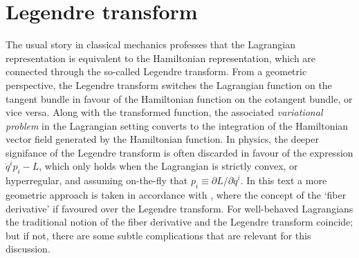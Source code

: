 \section{Legendre transform}
\label{sssec:mendel_legendre}
The usual story in classical mechanics professes that the Lagrangian representation is equivalent to the Hamiltonian representation, which are connected through the so-called Legendre transform. From a geometric perspective, the Legendre transform switches the Lagrangian function on the tangent bundle in favour of the Hamiltonian function on the cotangent bundle, or vice versa. Along with the transformed function, the associated \emph{variational problem} in the Lagrangian setting converts to the integration of the Hamiltonian vector field generated by the Hamiltonian function. In physics, the deeper signifance of the Legendre transform is often discarded in favour of the expression $\dot{q}^ip_i - L$, which only holds when the Lagrangian is strictly convex, or hyperregular, and assuming on-the-fly that $p_i \equiv \partial L/\partial\dot{q}^i$. In this text a more geometric approach is taken in accordance with \citet{Abraham1978}, where the concept of the `fiber derivative' if favoured over the Legendre transform. For well-behaved Lagrangians the traditional notion of the fiber derivative and the Legendre transform coincide; but if not, there are some subtle complications that are relevant for this discussion. 

